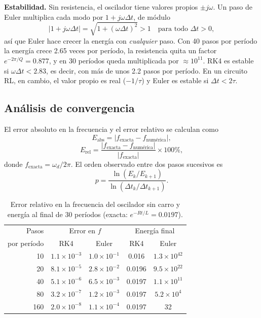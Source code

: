 \documentclass[10pt,onecolumn]{article}
\numberwithin{equation}{section}
\numberwithin{figure}{section}
\numberwithin{table}{section}
\begin{document}
\textbf{Estabilidad.} Sin resistencia, el oscilador tiene valores propios $\pm j\omega$. Un paso de Euler multiplica
cada modo por $1+j\omega\Delta t$, de módulo
\begin{equation}
 |1+j\omega\Delta t|=\sqrt{1+(\omega\Delta t)^2}>1 \quad\text{para todo }\Delta t>0,
 \label{eq:euler_inestable}
\end{equation}
así que Euler hace crecer la energía con \emph{cualquier} paso. Con 40 pasos por período la energía crece 2.65 veces
por período, la resistencia quita un factor $e^{-2\pi/Q}=0.877$, y en 30 períodos queda multiplicada por
$\approx10^{11}$. RK4 es estable si $\omega\Delta t<2.83$, es decir, con más de unos 2.2 pasos por período. En un
circuito RL, en cambio, el valor propio es real ($-1/\tau$) y Euler es estable si $\Delta t<2\tau$.

\subsection{Análisis de convergencia}

El error absoluto en la frecuencia y el error relativo se calculan como
\begin{equation}
    E_{\mathrm{abs}}=
    |f_{\mathrm{exacta}}-f_{\mathrm{numérica}}|,
    \label{eq:error}
\end{equation}
\begin{equation}
    E_{\mathrm{rel}}=
    \frac{|f_{\mathrm{exacta}}-f_{\mathrm{numérica}}|}
    {|f_{\mathrm{exacta}}|}
    \times 100\%,
    \label{eq:error_relativo}
\end{equation}
donde $f_{\mathrm{exacta}}=\omega_d/2\pi$. El orden observado entre dos pasos sucesivos es
\begin{equation}
 p=\frac{\ln(E_k/E_{k+1})}{\ln(\Delta t_k/\Delta t_{k+1})}.
 \label{eq:orden}
\end{equation}

\begin{table}[H]
    \centering
    \caption{Error relativo en la frecuencia del oscilador sin carro y energía al final de 30 períodos (exacta:
    $e^{-Rt/L}=0.0197$).}
    \label{tab:oscilador}
    \small
    \begin{tabular}{rcccc}
        \toprule
        Pasos & \multicolumn{2}{c}{Error en $f$} & \multicolumn{2}{c}{Energía final} \\
        por período & RK4 & Euler & RK4 & Euler \\
        \midrule
        10 & $1.1\times10^{-3}$ & $1.0\times10^{-1}$ & 0.016 & $1.3\times10^{42}$ \\
        20 & $8.1\times10^{-5}$ & $2.8\times10^{-2}$ & 0.0196 & $9.5\times10^{22}$ \\
        40 & $5.1\times10^{-6}$ & $6.5\times10^{-3}$ & 0.0197 & $1.1\times10^{11}$ \\
        80 & $3.2\times10^{-7}$ & $1.2\times10^{-3}$ & 0.0197 & $5.2\times10^{4}$ \\
        160 & $2.0\times10^{-8}$ & $1.1\times10^{-4}$ & 0.0197 & 32 \\
        \bottomrule
    \end{tabular}
\end{table}
\end{document}
